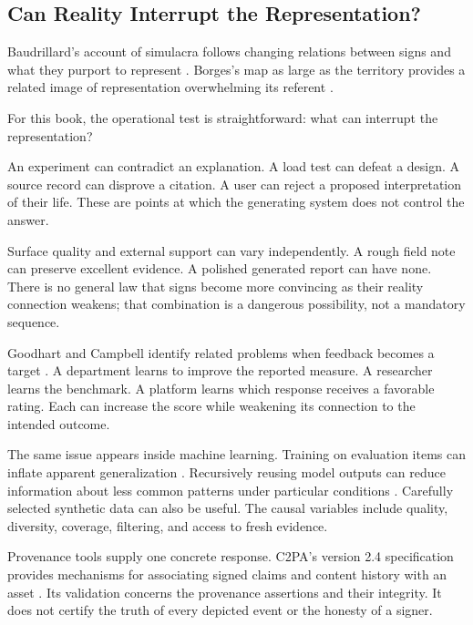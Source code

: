 \subsection{Can Reality Interrupt the Representation?}

Baudrillard's account of simulacra follows changing relations between signs and what they purport to represent \cite{baudrillard1981simulacres}. Borges's map as large as the territory provides a related image of representation overwhelming its referent \cite{borges1946rigor}.

For this book, the operational test is straightforward: what can interrupt the representation?

An experiment can contradict an explanation. A load test can defeat a design. A source record can disprove a citation. A user can reject a proposed interpretation of their life. These are points at which the generating system does not control the answer.

Surface quality and external support can vary independently. A rough field note can preserve excellent evidence. A polished generated report can have none. There is no general law that signs become more convincing as their reality connection weakens; that combination is a dangerous possibility, not a mandatory sequence.

Goodhart and Campbell identify related problems when feedback becomes a target \cite{goodhart1975problems,campbell1979assessing}. A department learns to improve the reported measure. A researcher learns the benchmark. A platform learns which response receives a favorable rating. Each can increase the score while weakening its connection to the intended outcome.

The same issue appears inside machine learning. Training on evaluation items can inflate apparent generalization \cite{sainz2023nlp}. Recursively reusing model outputs can reduce information about less common patterns under particular conditions \cite{shumailov2024ai}. Carefully selected synthetic data can also be useful. The causal variables include quality, diversity, coverage, filtering, and access to fresh evidence.

Provenance tools supply one concrete response. C2PA's version 2.4 specification provides mechanisms for associating signed claims and content history with an asset \cite{c2pa2026spec}. Its validation concerns the provenance assertions and their integrity. It does not certify the truth of every depicted event or the honesty of a signer.

